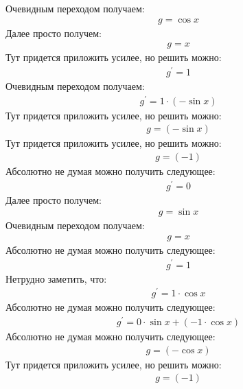 \documentclass[12pt,a4paper]{scrartcl}
\begin{document}
Очевидным переходом получаем:
\begin{gather}\label{eq:f2a58280}g  =  \cos{ x } \end{gather}
Далее просто получем:
\begin{gather}\label{eq:f2a58220}g  = x\end{gather}
Тут придется приложить усилее, но решить можно:
\begin{gather}\label{eq:f2a583d0}g^\prime  = 1\end{gather}
Очевидным переходом получаем:
\begin{gather}\label{eq:f2a581f0}g^\prime  = 1 \cdot  \left(- \sin{ x } \right) \end{gather}
Тут придется приложить усилее, но решить можно:
\begin{gather}\label{eq:f2a58220}g  =  \left(- \sin{ x } \right) \end{gather}
Тут придется приложить усилее, но решить можно:
\begin{gather}\label{eq:f2a583d0}g  = \left(-1\right)\end{gather}
Абсолютно не думая можно получить следующее:
\begin{gather}\label{eq:f2a58490}g^\prime  = 0\end{gather}
Далее просто получем:
\begin{gather}\label{eq:f2a58400}g  =  \sin{ x } \end{gather}
Очевидным переходом получаем:
\begin{gather}\label{eq:f2a58430}g  = x\end{gather}
Абсолютно не думая можно получить следующее:
\begin{gather}\label{eq:f2a58610}g^\prime  = 1\end{gather}
Нетрудно заметить, что:
\begin{gather}\label{eq:f2a585e0}g^\prime  = 1 \cdot  \cos{ x } \end{gather}
Абсолютно не думая можно получить следующее:
\begin{gather}\label{eq:f2a58280}g^\prime  = 0 \cdot  \sin{ x }  +  \left(-1 \cdot  \cos{ x } \right) \end{gather}
Абсолютно не думая можно получить следующее:
\begin{gather}\label{eq:f2a58430}g  =  \left(- \cos{ x } \right) \end{gather}
Тут придется приложить усилее, но решить можно:
\begin{gather}\label{eq:f2a583d0}g  = \left(-1\right)\end{gather}
\end{document}
